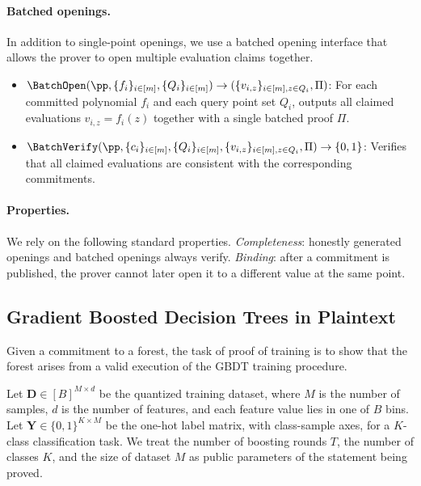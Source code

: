 \paragraph{Batched openings.}
In addition to single-point openings, we use a batched opening interface that
allows the prover to open multiple evaluation claims together.

\begin{itemize}
    \item $\BatchOpen(\pp, \{f_i\}_{i \in [m]}, \{Q_i\}_{i \in [m]})
    \rightarrow (\{v_{i,z}\}_{i \in [m], z \in Q_i}, \Pi)$:
    For each committed polynomial $f_i$ and each query point set $Q_i$,
    outputs all claimed evaluations $v_{i,z} = f_i(z)$ together with a single
    batched proof $\Pi$.

    \item $\BatchVerify(\pp, \{c_i\}_{i \in [m]}, \{Q_i\}_{i \in [m]},
    \{v_{i,z}\}_{i \in [m], z \in Q_i}, \Pi) \rightarrow \{0,1\}$:
    Verifies that all claimed evaluations are consistent with the corresponding
    commitments.
\end{itemize}

\paragraph{Properties.}
We rely on the following standard properties. \emph{Completeness}: honestly generated openings
and batched openings always verify.  \emph{Binding}: after a
commitment is published, the prover cannot later open it to a different value at
the same point. 

\subsection{Gradient Boosted Decision Trees in Plaintext}

Given a commitment to a forest, the task of proof of training is to show that
the forest arises from a valid execution of the GBDT training procedure.

Let $\mathbf{D}\in[B]^{M\times d}$ be the quantized training dataset, where
$M$ is the number of samples, $d$ is the number of features, and each feature
value lies in one of $B$ bins. Let $\mathbf{Y}\in\{0,1\}^{K\times M}$ be the
one-hot label matrix, with class-sample axes, for a $K$-class classification task. We treat the number
of boosting rounds $T$,
the number of classes $K$,
and the size of dataset $M$
as public parameters of the statement being proved.

